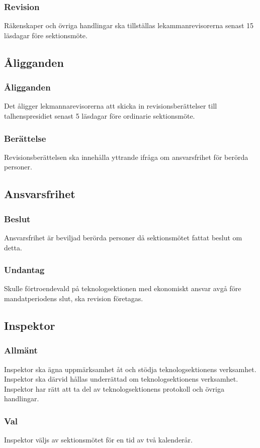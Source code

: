 \documentclass[a4paper]{dtek}
\begin{document}
\subsubsection{Revision}
Räkenskaper och övriga handlingar ska tillställas lekammanrevisorerna senast 15 läsdagar före sektionsmöte.
\subsection{Åligganden}
\subsubsection{Åligganden}
Det åligger lekmannarevisorerna att skicka in revisionsberättelser till talhenspresidiet senast 5 läsdagar före ordinarie sektionsmöte.
\subsubsection{Berättelse}
Revisionsberättelsen ska innehålla yttrande ifråga om ansvarsfrihet för berörda personer.
\subsection{Ansvarsfrihet}
\subsubsection{Beslut}
Ansvarsfrihet är beviljad berörda personer då sektionsmötet fattat beslut om detta.
\subsubsection{Undantag}
Skulle förtroendevald på teknologsektionen med ekonomiskt ansvar avgå före mandatperiodens slut, ska revision företagas.
\subsection{Inspektor}
\subsubsection{Allmänt}
Inspektor ska ägna uppmärksamhet åt och stödja teknologsektionens verksamhet. Inspektor ska därvid hållas underrättad om teknologsektionens verksamhet. Inspektor har rätt att ta del av teknologsektionens protokoll och övriga handlingar.
\subsubsection{Val}
Inspektor väljs av sektionsmötet för en tid av två kalenderår.
\newpage
\end{document}
